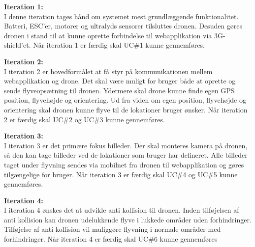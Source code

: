 \textbf{Iteration 1:} \\
I denne iteration tages hånd om systemet mest grundlæggende funktionalitet. Batteri, ESC'er, motorer og ultralyds sensorer tilsluttes dronen. Desuden gøres dronen i stand til at kunne oprette forbindelse til webapplikation via 3G-shield'et. Når iteration 1 er færdig skal UC\#1 kunne gennemføres.  

\textbf{Iteration 2:} \\
I iteration 2 er hovedformålet at få styr på kommunikationen mellem webapplikation og drone. Det skal være muligt for bruger både at oprette og sende flyveopsætning til dronen. 
Ydermere skal drone kunne finde egen GPS position, flyvehøjde og orientering. Ud fra viden om egen position, flyvehøjde og orientering skal dronen kunne flyve til de lokationer bruger ønsker. Når iteration 2 er færdig skal UC\#2 og UC\#3 kunne gennemføres.  

\textbf{Iteration 3:}  \\
I iteration 3 er det primære fokus billeder. Der skal monteres kamera på dronen, så den kan tage billeder ved de lokationer som bruger har defineret. Alle billeder taget under flyvning sendes via mobilnet fra dronen til webapplikation og gøres tilgængelige for bruger. Når iteration 3 er færdig skal UC\#4 og UC\#5 kunne gennemføres.

\textbf{Iteration 4:} \\
I iteration 4 ønskes det at udvikle anti kollision til dronen. 
Inden tilføjelsen af anti kollision kan dronen udelukkende flyve i lukkede områder uden forhindringer. Tilføjelse af anti kollision vil muliggøre flyvning i normale områder med forhindringer. Når iteration 4 er færdig skal UC\#6 kunne gennemføres  
